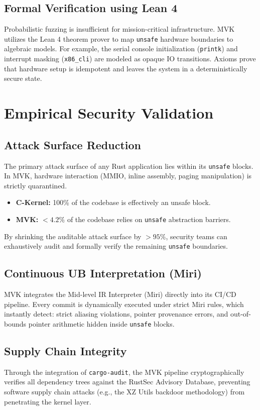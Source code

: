 \documentclass[conference]{IEEEtran}
\begin{document}
\subsection{Formal Verification using Lean 4}
Probabilistic fuzzing is insufficient for mission-critical infrastructure. MVK utilizes the Lean 4 theorem prover to map \texttt{unsafe} hardware boundaries to algebraic models.
For example, the serial console initialization (\texttt{printk}) and interrupt masking (\texttt{x86\_cli}) are modeled as opaque IO transitions. Axioms prove that hardware setup is idempotent and leaves the system in a deterministically secure state.

\section{Empirical Security Validation}

\subsection{Attack Surface Reduction}
The primary attack surface of any Rust application lies within its \texttt{unsafe} blocks. In MVK, hardware interaction (MMIO, inline assembly, paging manipulation) is strictly quarantined.
\begin{itemize}
    \item \textbf{C-Kernel:} 100\% of the codebase is effectively an unsafe block.
    \item \textbf{MVK:} $<4.2\%$ of the codebase relies on \texttt{unsafe} abstraction barriers.
\end{itemize}
By shrinking the auditable attack surface by $>95\%$, security teams can exhaustively audit and formally verify the remaining \texttt{unsafe} boundaries.

\subsection{Continuous UB Interpretation (Miri)}
MVK integrates the Mid-level IR Interpreter (Miri) directly into its CI/CD pipeline. Every commit is dynamically executed under strict Miri rules, which instantly detect: strict aliasing violations, pointer provenance errors, and out-of-bounds pointer arithmetic hidden inside \texttt{unsafe} blocks.

\subsection{Supply Chain Integrity}
Through the integration of \texttt{cargo-audit}, the MVK pipeline cryptographically verifies all dependency trees against the RustSec Advisory Database, preventing software supply chain attacks (e.g., the XZ Utils backdoor methodology) from penetrating the kernel layer.
\end{document}
